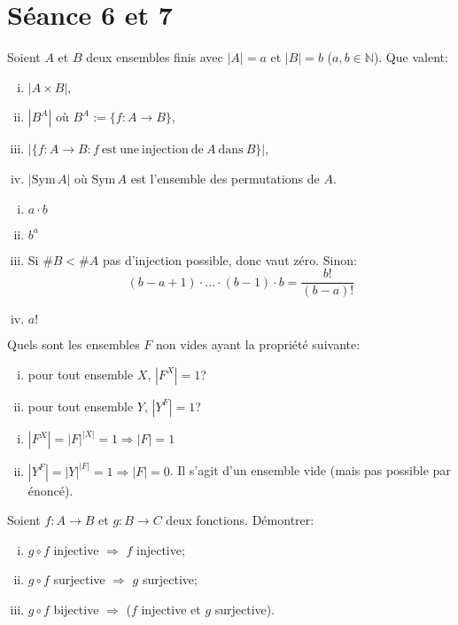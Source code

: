 \section{Séance 6 et 7}

\begin{exo}
Soient $A$ et $B$ deux ensembles finis avec $|A|=a$ et $|B|=b$ ($a,b \in \mathbb{N}$). Que valent:
\begin{enumerate}[(i)]
\item $|A\times B|$,
\item $|B^A|$ o\`u $B^A:=\{f:A \rightarrow B\}$,
\item $|\{f:A \rightarrow B: f \mathrm{~est~une~injection~de~} A \mathrm{~dans~}B\}|$,
\item $|\mathrm{Sym}\,A|$ o\`u $\mathrm{Sym}\,A$ est l'ensemble des permutations de $A$.
\end{enumerate}
\end{exo}

\begin{enumerate}[(i)]
	\item $a\cdot b$
	\item $b^a$
	\item Si $\#B < \#A$ pas d'injection possible, donc vaut zéro. Sinon: \[(b-a+1)\cdot ... \cdot (b-1) \cdot b = \frac{b!}{(b-a)!}\]
	\item $a!$
\end{enumerate}


\begin{exo}
Quels sont les ensembles $F$ non vides ayant la propri\'et\'e suivante:
\begin{enumerate}[(i)]
\item pour tout ensemble $X$, $|F^X|=1$?
\item pour tout ensemble $Y$, $|Y^F|=1$?
\end{enumerate}
\end{exo}

\begin{enumerate}[(i)]
	\item $|F^X| = |F|^{|X|} = 1 \Rightarrow |F| = 1 $
	\item $|Y^F| = |Y|^{|F|} = 1 \Rightarrow |F| = 0 $. Il s'agit d'un ensemble vide (mais pas possible par énoncé).
\end{enumerate}


\begin{exo}
Soient $f:A \rightarrow B$ et $g:B \rightarrow C$ deux fonctions. D\'emontrer:
\begin{enumerate}[(i)]
\item $g \circ f$ injective $\Rightarrow$ $f$ injective;
\item $g \circ f$ surjective $\Rightarrow$ $g$ surjective;
\item $g \circ f$ bijective $\Rightarrow$ ($f$ injective et $g$ surjective).
\end{enumerate}
\end{exo}

